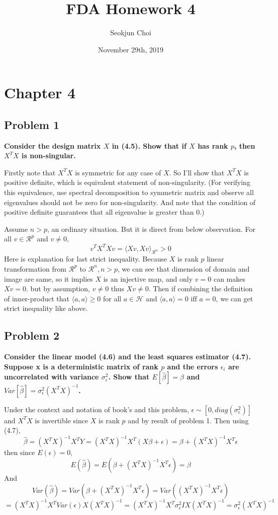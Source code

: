 \documentclass{article}
\begin{document}
\title{FDA Homework 4}
\author{Seokjun Choi}
\date{November 29th, 2019}
\maketitle

\section{Chapter 4}
\subsection{Problem 1}
\textbf{
Consider the design matrix $X$ in (4.5). 
Show that if $X$ has rank $p$, then $X^TX$ is non-singular.
}

Firstly note that $X^TX$ is symmetric for any case of $X$.
So I'll show that $X^TX$ is positive definite, which is equivalent statement of non-singularity.
(For verifying this equivalence, use spectral decomposition to symmetric matrix 
and observe all eigenvalues should not be zero for non-singularity.
And note that the condition of positive definite guarantees that all eigenvalue is greater than 0.)

Assume $n>p$, an ordinary situation.
But it is direct from below observation. For all $v\in\mathcal{R}^p$ and $v\neq 0$,
\[v^TX^TXv=\langle Xv, Xv\rangle_{\mathcal{R}^n} > 0\]
Here is explanation for last strict inequality.
Because $X$ is rank $p$ linear transformation from $\mathcal{R}^p$ to $\mathcal{R}^n, n>p$,
we can see that dimension of domain and image are same, so
it implies $X$ is an injective map, and
only $v=0$ can makes $Xv=0$. but by assumption, $v\neq 0$ thus $Xv\neq 0$.
Then if combining the definition of inner-product that 
$\langle a,a \rangle \geq 0$ for all $a\in \mathcal{H} $ and $\langle a,a\rangle=0 \text{ iff } a=0$,
we can get strict inequality like above.


\subsection{Problem 2}
\textbf{
Consider the linear model (4.6) and the least squares estimator (4.7).
Suppose x is a deterministic matrix of rank $p$ and the errors $\epsilon_i$ are
uncorrelated with variance $\sigma_\epsilon^2$. Show that $E[\hat{\beta}]=\beta$ and 
$Var[\hat{\beta}]=\sigma_\epsilon^2(X^TX)^{-1}$.
}

Under the context and notation of book's and this problem,
\(\epsilon\sim[0, diag(\sigma^2_{\epsilon})]\) and
$X^TX$ is invertible since $X$ is rank $p$ and by result of problem 1.
Then using (4.7),
\[\hat{\beta}=(X^TX)^{-1}X^TY=(X^TX)^{-1}X^T(X\beta+\epsilon)=\beta+(X^TX)^{-1}X^T\epsilon\]
then since $E(\epsilon)=0$,
\[E(\hat{\beta})=E(\beta+(X^TX)^{-1}X^T\epsilon)=\beta\]
And
\[Var(\hat{\beta})=Var(\beta+(X^TX)^{-1}X^T\epsilon)=Var((X^TX)^{-1}X^T\epsilon)\]
\[=(X^TX)^{-1}X^TVar(\epsilon)X(X^TX)^{-1}=(X^TX)^{-1}X^T\sigma^2_{\epsilon}IX(X^TX)^{-1}=\sigma^2_{\epsilon}(X^TX)^{-1}\]
\end{document}

